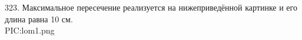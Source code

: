323. Максимальное пересечение реализуется на нижеприведённой картинке и его длина равна 10 см.\\
{{PIC:lom1.png}}\\
